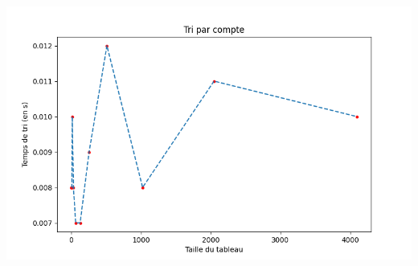 \documentclass[11pt,a4paper]{article}
\begin{document}
    \includegraphics[scale = 0.7]{../Courbes/Valeurs_triées_avec_répétitions/Tri par compte.png}
\end{document}
